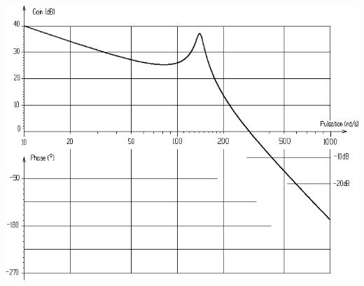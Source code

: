\documentclass[10pt,fleqn]{article} %
\begin{document}
\ifprof
\else
\begin{center}
\includegraphics[width=\linewidth]{images/fig_02}
\end{center}
\fi
\end{document}
